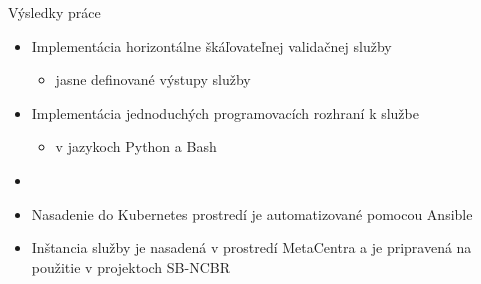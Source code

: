 \documentclass[
  aspectratio=169,
]{beamer}
\begin{document}
\begin{frame}{Výsledky práce}
\begin{itemize}
  \item Implementácia horizontálne škáľovateľnej validačnej služby
  \begin{itemize}
    \item jasne definované výstupy služby
  \end{itemize}

  \item Implementácia jednoduchých programovacích rozhraní k službe
  \begin{itemize}
    \item v jazykoch Python a Bash
  \end{itemize}
  \item 

  \item Nasadenie do Kubernetes prostredí je automatizované pomocou Ansible
  \item Inštancia služby je nasadená v prostredí MetaCentra a je pripravená na použitie v projektoch SB-NCBR
\end{itemize}
\end{frame}
\end{document}
